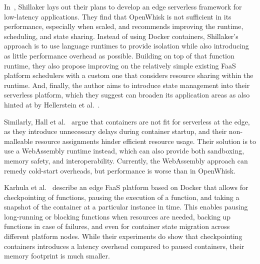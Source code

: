 In~\cite{Shillaker2018-di}, Shillaker lays out their plans to develop an edge serverless framework for low-latency applications.
They find that OpenWhisk is not sufficient in its performance, especially when scaled, and recommends improving the runtime, scheduling, and state sharing.
Instead of using Docker containers, Shillaker's approach is to use language runtimes to provide isolation while also introducing as little performance overhead as possible.
Building on top of that function runtime, they also propose improving on the relatively simple existing FaaS platform schedulers with a custom one that considers resource sharing within the runtime.
And, finally, the author aims to introduce state management into their serverless platform, which they suggest can broaden its application areas as also hinted at by Hellerstein et al.~\cite{paper_hellerstein_serverless}.

Similarly, Hall et al.~\cite{Hall2019-im} argue that containers are not fit for serverless at the edge, as they introduce unnecessary delays during container startup, and their non-malleable resource assignments hinder efficient resource usage.
Their solution is to use a WebAssembly runtime instead, which can also provide both sandboxing, memory safety, and interoperability.
Currently, the WebAssembly approach can remedy cold-start overheads, but performance is worse than in OpenWhisk.

Karhula et al.~\cite{Karhula2019-en} describe an edge FaaS platform based on Docker that allows for checkpointing of functions, pausing the execution of a function, and taking a snapshot of the container at a particular instance in time.
This enables pausing long-running or blocking functions when resources are needed, backing up functions in case of failures, and even for container state migration across different platform nodes.
While their experiments do show that checkpointing containers introduces a latency overhead compared to paused containers, their memory footprint is much smaller.
